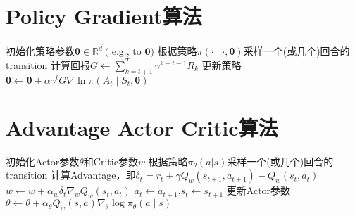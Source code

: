 \documentclass[11pt]{ctexart}
\begin{document}
\section{Policy Gradient算法}
\begin{algorithm}[H] %
	\renewcommand{\thealgorithm}{} %
	\caption{} 
	\begin{algorithmic}[1] %
		\STATE 初始化策略参数$\boldsymbol{\theta} \in \mathbb{R}^{d^{\prime}}($ e.g., to $\mathbf{0})$
			\STATE 根据策略$\pi(\cdot \mid \cdot, \boldsymbol{\theta})$采样一个(或几个)回合的transition
				\STATE 计算回报$G \leftarrow \sum_{k=t+1}^{T} \gamma^{k-t-1} R_{k}$
				\STATE 更新策略$\boldsymbol{\theta} \leftarrow {\boldsymbol{\theta}+\alpha \gamma^{t}} G \nabla \ln \pi\left(A_{t} \mid S_{t}, \boldsymbol{\theta}\right)$
			\ENDFOR
		\ENDFOR
	\end{algorithmic}
\end{algorithm}
\clearpage
\section{Advantage Actor Critic算法}
\begin{algorithm}[H] %
	\renewcommand{\thealgorithm}{} %
	\caption{} 
	\begin{algorithmic}[1] %
		\STATE 初始化Actor参数$\theta$和Critic参数$w$
			\STATE 根据策略$\pi_{\theta}(a|s)$采样一个(或几个)回合的transition
				\STATE 计算Advantage，即$ \delta_t = r_t + \gamma Q_w(s_{t+1},a_{t+1})-Q_w(s_t,a_t)$
				\STATE $w \leftarrow w+\alpha_{w} \delta_{t} \nabla_{w} Q_w(s_t,a_t)$
				\STATE $a_t \leftarrow a_{t+1}$,$s_t \leftarrow s_{t+1}$
			\ENDFOR
			\STATE 更新Actor参数$\theta \leftarrow \theta+\alpha_{\theta} Q_{w}(s, a) \nabla_{\theta} \log \pi_{\theta}(a \mid s)$
		\ENDFOR
	\end{algorithmic}
\end{algorithm}

\clearpage
\end{document}
